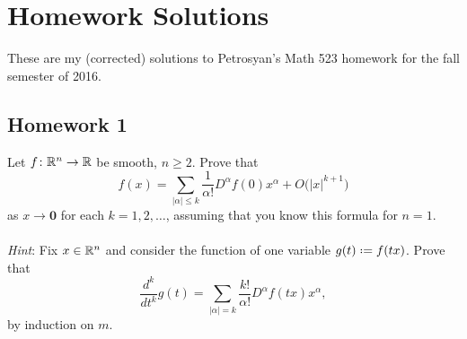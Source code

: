 \section{Homework Solutions}
These are my (corrected) solutions to Petrosyan's Math 523 homework for the
fall semester of 2016.
\subsection{Homework 1}
\begin{problem}
  Let \(f\colon\mathbb{R}^n\to\mathbb{R}\) be smooth, \(n\geq 2\). Prove that
  \[
    f(x)=\sum_{|\alpha|\leq k}
    \frac{1}{\alpha!}D^\alpha f(0)x^\alpha+O\bigl(|x|^{k+1}\bigr)
  \]
  as \(x\to\mathbf{0}\) for each \(k=1,2,\dotsc\), assuming that you know this
  formula for \(n=1\).
  \\\\
  \emph{Hint}: Fix \(x\in\mathbb{R}^n\) and consider the function of
  one variable \(g(t)\defeq f(tx)\). Prove that
  \[
    \frac{d^k}{dt^k}g(t)
    =\sum_{|\alpha|=k}\frac{k!}{\alpha!} D^\alpha f(tx)x^\alpha,
  \]
  by induction on \(m\).
\end{problem}
